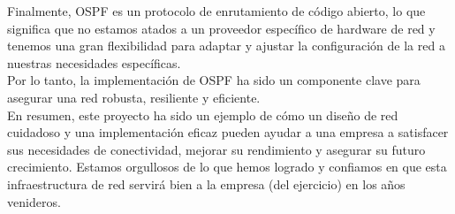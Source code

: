 Finalmente, OSPF es un protocolo de enrutamiento de código abierto, lo que
significa que no estamos atados a un proveedor específico de hardware de red y
tenemos una gran flexibilidad para adaptar y ajustar la configuración de la red
a nuestras necesidades específicas.
\\

Por lo tanto, la implementación de OSPF ha sido un componente clave para
asegurar una red robusta, resiliente y eficiente.
\\

En resumen, este proyecto ha sido un ejemplo de cómo un diseño de red cuidadoso
y una implementación eficaz pueden ayudar a una empresa a satisfacer sus
necesidades de conectividad, mejorar su rendimiento y asegurar su futuro
crecimiento. Estamos orgullosos de lo que hemos logrado y confiamos en que esta
infraestructura de red servirá bien a la empresa (del ejercicio) en los años 
venideros.